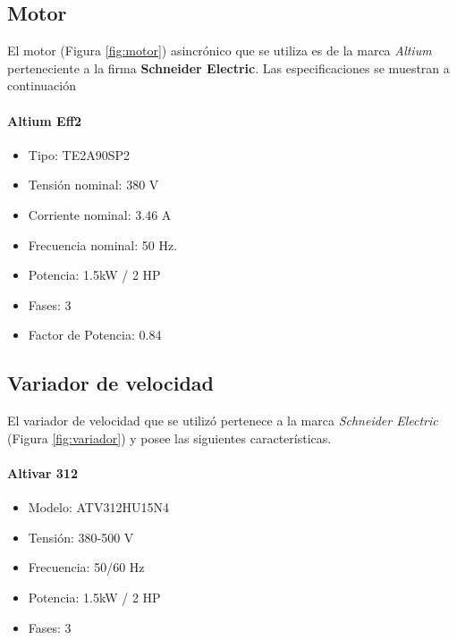 \subsection{Motor}


El motor (Figura \ref{fig:motor}) asincrónico que se utiliza es de la marca \textit{Altium} perteneciente a la firma \textbf{Schneider Electric}. Las especificaciones se muestran a continuación \\
\paragraph*{Altium Eff2}

\begin{minipage}[t]{.5\textwidth}
	\begin{itemize}
		\item Tipo: TE2A90SP2
		\item Tensión nominal: 380 V
		\item Corriente nominal: 3.46 A
		\item Frecuencia nominal:  50 Hz.
		\item Potencia: 1.5kW / 2 HP
		\item Fases: 3
		\item Factor de Potencia: 0.84
	\end{itemize}
\end{minipage}
\begin{minipage}[t]{.5\textwidth}
	\centering{}
	\label{fig:motor}

\end{minipage}

\subsection{Variador de velocidad}



El variador de velocidad que se utilizó pertenece a la marca \textit{Schneider Electric} (Figura \ref{fig:variador}) y posee las siguientes características.
\paragraph*{Altivar 312}
\begin{minipage}[t]{.5\textwidth}
	\begin{itemize}
		\item 	Modelo: ATV312HU15N4
		\item   Tensión: 380-500 V
		\item 	Frecuencia: 50/60 Hz
		\item 	Potencia: 1.5kW / 2 HP
		\item 	Fases: 3
	\end{itemize}
\end{minipage}
\begin{minipage}[t]{.5\textwidth}
	\centering{}
	\label{fig:variador}
\end{minipage}


